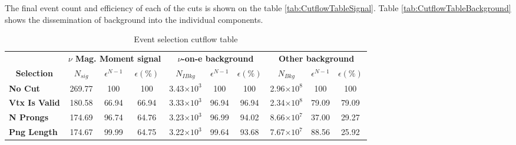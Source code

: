 The final event count and efficiency of each of the cuts is shown on the table \ref{tab:CutflowTableSignal}. Table \ref{tab:CutflowTableBackground} shows the dissemination of background into the individual components.

\begin{table}[!hb]
\caption{Event selection cutflow table}
\begin{tabular}{|l|ccc|ccc|ccc|}\hline
\multicolumn{1}{|c|}{}                                     & \multicolumn{3}{c|}{\textbf{$\nu$ Mag. Moment signal}}          & \multicolumn{3}{c|}{\textbf{$\nu$-on-e background}}                      & \multicolumn{3}{c|}{\textbf{Other background}}                           \\
\multicolumn{1}{|c|}{\multirow{-2}{*}{\textbf{Selection}}} & \multicolumn{1}{c}{\textbf{$N_{sig}$}} & \textbf{$\epsilon^{N-1}$} & \textbf{$\epsilon \left(\%\right)$} & \multicolumn{1}{c}{\textbf{$N_{IBkg}$}} & \textbf{$\epsilon^{N-1}$} & \textbf{$\epsilon \left(\%\right)$} & \multicolumn{1}{c}{\textbf{$N_{Bkg}$}} & \textbf{$\epsilon^{N-1}$} & \textbf{$\epsilon \left(\%\right)$} \\\hline
\textbf{No Cut}      & 269.77            & 100 & 100 & 3.43$\times 10^3$           & 100 & 100                                     & 2.96$\times 10^8$          & 100                                                             & 100                                    \\
\textbf{Vtx Is Valid}  & 180.58            & 66.94                                                              & 66.94                                     & 3.33$\times 10^3$               & 96.94                                                               & 96.94                                      & 2.34$\times 10^8$          & 79.09                                                              & 79.09                                     \\
\textbf{N Prongs}        & 174.69            & 96.74                                                              & 64.76                                     & 3.23$\times 10^3$                             & 96.99                                                               & 94.02                                      & 8.66$\times 10^7$                     & 37.00                                                                 & 29.27                                     \\
\textbf{Png Length}  & 174.67            & 99.99                                                              & 64.75                                     & 3.22$\times 10^3$                                          & 99.64                                                               & 93.68                                      & 7.67$\times 10^7$                              & 88.56                                                              & 25.92                                     \\

\end{tabular}
\end{table}
